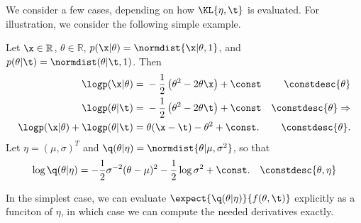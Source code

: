 We consider a few cases, depending on how $\KL{\eta, \t}$ is evaluated.
For illustration, we consider the following simple example.

\begin{ex}
%
Let $\x \in \mathbb{R}$, $\theta \in \mathbb{R}$, $p(\x \vert \theta) = \normdist{\x
\vert \theta, 1}$, and $p(\theta \vert \t) = \normdist(\theta \vert \t, 1)$.  Then
%
\begin{align*}
%
\logp(\x \vert \theta) ={}&
    -\frac{1}{2} \left(\theta^2 - 2 \theta \x \right) + \const
    & \constdesc{\theta} \\
\logp(\theta \vert \t)={}&
    -\frac{1}{2} \left(\theta^2 - 2 \theta \t \right) + \const
    & \constdesc{\theta} \Rightarrow  \\
\logp(\x \vert \theta) + \logp(\theta \vert \t)={}&
    \theta(\x - \t) - \theta^2 + \const.
    & \constdesc{\theta}.
%
\end{align*}
%
Let $\eta = (\mu, \sigma)^T$ and $\q(\theta \vert \eta) = \normdist{\theta \vert \mu,
\sigma^2}$, so that
%
\begin{align*}
%
\log \q(\theta \vert \eta) &=
    -\frac{1}{2} \sigma^{-2} (\theta - \mu)^2 -\frac{1}{2} \log \sigma^2 +
    \const.&\constdesc{\theta, \eta}
%
\end{align*}
%
\end{ex}

In the simplest case, we can evaluate $\expect{\q(\theta \vert \eta)}{ f(\theta,
\t) }$ explicitly as a funciton of $\eta$, in which case we can compute
the needed derivatives exactly.


